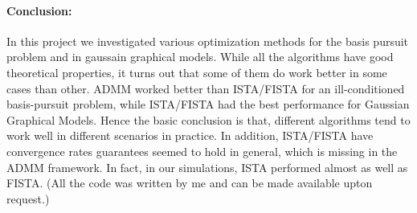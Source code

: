 \documentclass[12pt, leqno]{article}
\theoremstyle{remark}
\begin{document}
\paragraph{Conclusion:} In this project we investigated various optimization methods for the basis pursuit problem and in gaussain graphical models. While all the algorithms have good theoretical properties, it turns out that some of them do work better in some cases than other. ADMM worked better than ISTA/FISTA for an ill-conditioned basis-pursuit problem, while ISTA/FISTA had the best performance for Gaussian Graphical Models. Hence the basic conclusion is that, different algorithms tend to work well in different scenarios in practice. In addition, ISTA/FISTA have convergence rates guarantees seemed to hold in general, which is missing in the ADMM framework. In fact, in our simulations, ISTA performed almost as well as FISTA. (All the code was written by me and can be made available upton request.) 
\end{document}
